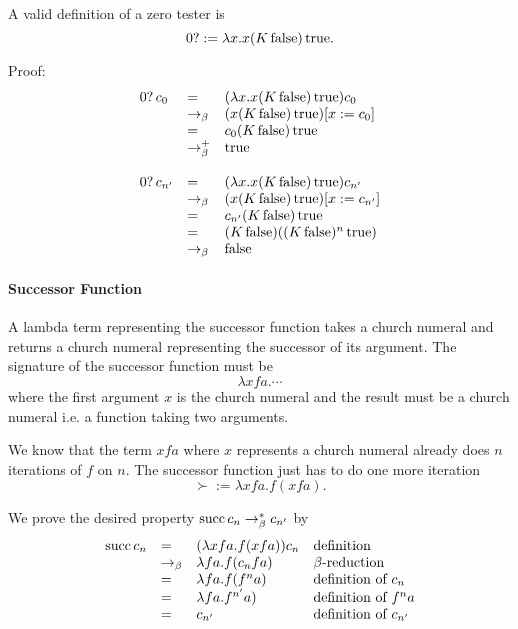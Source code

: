 A valid definition of a zero tester is
$$ 0? := \lambda x. x (K\, \text{false}) \, \text{true}.$$

Proof:
$$
\begin{array}{lll}
  0?\, c_0
  &= &(\lambda x. x (K\, \text{false}) \, \text{true}) c_0\\
  &\to_\beta & (x (K\, \text{false}) \, \text{true})[x:=c_0] \\
  &= & c_0 (K\, \text{false}) \, \text{true} \\
  &\to^+_\beta & \text{true} \\
  \\
  0?\, c_{n'}
  &=& (\lambda x. x (K\, \text{false}) \, \text{true}) c_{n'}\\
  &\to_\beta & (x (K\, \text{false}) \, \text{true})[x:=c_{n'}] \\
  &= & c_{n'} (K\, \text{false}) \, \text{true} \\
  &=&  (K\,\text{false})  ( (K\,\text{false})^n\, \text{true}) \\
  &\to_\beta & \text{false}
\end{array}
$$

\paragraph{Successor Function}

A lambda term representing the successor function takes a church numeral and
returns a church numeral representing the successor of its argument. The
signature of the successor function must be
$$ \lambda x f a. \cdots$$
where the first argument $x$ is the church numeral and the result must be a
church numeral i.e. a function taking two arguments.

We know that the term $x f a$ where $x$ represents a church numeral already
does $n$ iterations of $f$ on $n$. The successor function just has to do one
more iteration
$$
\succ := \lambda x f a. f (x f a).
$$

We prove the desired property $\text{succ}\, c_n \to^*_\beta c_{n'}$ by
$$
\begin{array}{llll}
    \text{succ}\, c_{n} &= & (\lambda x f a. f (x f a)) c_{n} & \text{definition} \\
     & \to_\beta & \lambda f a. f (c_{n} f a) & \beta\text{-reduction} \\
     & = & \lambda f a. f (f^{n} a) & \text{definition of }c_{n} \\
     & = & \lambda f a. f^{n'} a) & \text{definition of }f^n a \\
     & = & c_{n'} & \text{definition of }c_{n'}
\end{array}
$$






